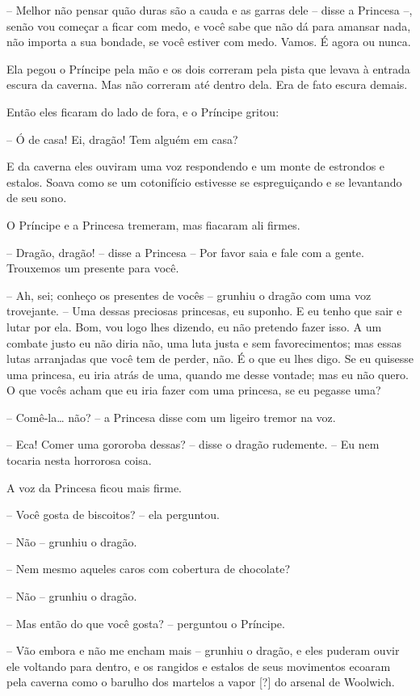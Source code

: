 -- Melhor não pensar quão duras são a cauda e as garras dele -- disse a
Princesa --, senão vou começar a ficar com medo, e você sabe que não
dá para amansar nada, não importa a sua bondade, se você estiver com
medo. Vamos. É agora ou nunca.

Ela pegou o Príncipe pela mão e os dois correram pela pista que levava
à entrada escura da caverna. Mas não correram até dentro dela. Era de
fato escura demais.

Então eles ficaram do lado de fora, e o Príncipe gritou: 

-- Ó de casa! Ei, dragão! Tem alguém em casa?

E da caverna eles ouviram uma voz respondendo e um monte de estrondos
e estalos. Soava como se um cotonifício estivesse se espreguiçando e
se levantando de seu sono.

O Príncipe e a Princesa tremeram, mas fiacaram ali firmes.

-- Dragão, dragão! -- disse a Princesa -- Por favor saia e fale com a
gente. Trouxemos um presente para você.

-- Ah, sei; conheço os presentes de vocês -- grunhiu o dragão com uma
voz trovejante. -- Uma dessas preciosas princesas, eu suponho. E eu
tenho que sair e lutar por ela. Bom, vou logo lhes dizendo, eu não
pretendo fazer isso. A um combate justo eu não diria não, uma luta
justa e sem favorecimentos; mas essas lutas arranjadas que você tem
de perder, não. É o que eu lhes digo. Se eu quisesse uma princesa, eu
iria atrás de uma, quando me desse vontade; mas eu não quero. O que
vocês acham que eu iria fazer com uma princesa, se eu pegasse uma?

-- Comê-la… não? -- a Princesa disse com um ligeiro tremor na voz. 

-- Eca! Comer uma gororoba dessas? -- disse o dragão rudemente. -- Eu nem
tocaria nesta horrorosa coisa. 

A voz da Princesa ficou mais firme.

-- Você gosta de biscoitos? -- ela perguntou.

-- Não -- grunhiu o dragão.

-- Nem mesmo aqueles caros com cobertura de chocolate?

-- Não -- grunhiu o dragão.

-- Mas então do que você gosta? -- perguntou o Príncipe. 

-- Vão embora e não me encham mais -- grunhiu o dragão, e eles puderam
ouvir ele voltando para dentro, e os rangidos e estalos de seus
movimentos ecoaram pela caverna como o barulho dos martelos a vapor
[?] do arsenal de Woolwich.

